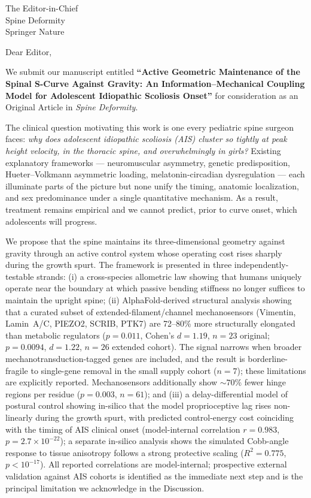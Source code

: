\documentclass[12pt]{letter}
\begin{document}
\begin{letter}{The Editor-in-Chief\\Spine Deformity\\Springer Nature}

\opening{Dear Editor,}

We submit our manuscript entitled \textbf{``Active Geometric Maintenance of the Spinal S-Curve Against Gravity: An Information--Mechanical Coupling Model for Adolescent Idiopathic Scoliosis Onset''} for consideration as an Original Article in \textit{Spine Deformity}.

The clinical question motivating this work is one every pediatric spine surgeon faces: \textit{why does adolescent idiopathic scoliosis (AIS) cluster so tightly at peak height velocity, in the thoracic spine, and overwhelmingly in girls?} Existing explanatory frameworks --- neuromuscular asymmetry, genetic predisposition, Hueter--Volkmann asymmetric loading, melatonin-circadian dysregulation --- each illuminate parts of the picture but none unify the timing, anatomic localization, and sex predominance under a single quantitative mechanism. As a result, treatment remains empirical and we cannot predict, prior to curve onset, which adolescents will progress.

We propose that the spine maintains its three-dimensional geometry against gravity through an active control system whose operating cost rises sharply during the growth spurt. The framework is presented in three independently-testable strands: (i) a cross-species allometric law showing that humans uniquely operate near the boundary at which passive bending stiffness no longer suffices to maintain the upright spine; (ii) AlphaFold-derived structural analysis showing that a curated subset of extended-filament/channel mechanosensors (Vimentin, Lamin~A/C, PIEZO2, SCRIB, PTK7) are 72--80\% more structurally elongated than metabolic regulators ($p = 0.011$, Cohen's $d = 1.19$, $n = 23$ original; $p = 0.0094$, $d = 1.22$, $n = 26$ extended cohort). The signal narrows when broader mechanotransduction-tagged genes are included, and the result is borderline-fragile to single-gene removal in the small supply cohort ($n = 7$); these limitations are explicitly reported. Mechanosensors additionally show $\sim 70$\% fewer hinge regions per residue ($p = 0.003$, $n = 61$); and (iii) a delay-differential model of postural control showing in-silico that the model proprioceptive lag rises non-linearly during the growth spurt, with predicted control-energy cost coinciding with the timing of AIS clinical onset (model-internal correlation $r = 0.983$, $p = 2.7 \times 10^{-22}$); a separate in-silico analysis shows the simulated Cobb-angle response to tissue anisotropy follows a strong protective scaling ($R^2 = 0.775$, $p < 10^{-17}$). All reported correlations are model-internal; prospective external validation against AIS cohorts is identified as the immediate next step and is the principal limitation we acknowledge in the Discussion.


\end{letter}
\end{document}
